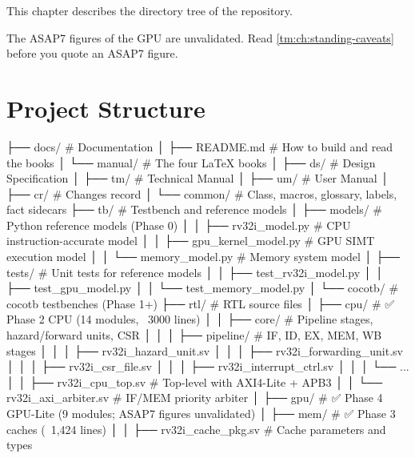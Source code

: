 This chapter describes the directory tree of the repository.

\begin{information}
The ASAP7 figures of the GPU are unvalidated. Read \cref{tm:ch:standing-caveats} before you quote an ASAP7 figure.
\end{information}

\section{Project Structure}\label{um:guide:project-structure}

\begin{logblock}
├── docs/                         # Documentation
│   ├── README.md                 # How to build and read the books
│   └── manual/                   # The four LaTeX books
│       ├── ds/                   # Design Specification
│       ├── tm/                   # Technical Manual
│       ├── um/                   # User Manual
│       ├── cr/                   # Changes record
│       └── common/               # Class, macros, glossary, labels, fact sidecars
├── tb/                          # Testbench and reference models
│   ├── models/                   # Python reference models (Phase 0)
│   │   ├── rv32i_model.py        # CPU instruction-accurate model
│   │   ├── gpu_kernel_model.py   # GPU SIMT execution model
│   │   └── memory_model.py       # Memory system model
│   ├── tests/                    # Unit tests for reference models
│   │   ├── test_rv32i_model.py
│   │   ├── test_gpu_model.py
│   │   └── test_memory_model.py
│   └── cocotb/                   # cocotb testbenches (Phase 1+)
├── rtl/                          # RTL source files
│   ├── cpu/                      # ✅ Phase 2 CPU (14 modules, ~3000 lines)
│   │   ├── core/                 # Pipeline stages, hazard/forward units, CSR
│   │   │   ├── pipeline/         # IF, ID, EX, MEM, WB stages
│   │   │   ├── rv32i_hazard_unit.sv
│   │   │   ├── rv32i_forwarding_unit.sv
│   │   │   ├── rv32i_csr_file.sv
│   │   │   ├── rv32i_interrupt_ctrl.sv
│   │   │   └── ...
│   │   ├── rv32i_cpu_top.sv      # Top-level with AXI4-Lite + APB3
│   │   └── rv32i_axi_arbiter.sv  # IF/MEM priority arbiter
│   ├── gpu/                      # ✅ Phase 4 GPU-Lite (9 modules; ASAP7 figures unvalidated)
│   ├── mem/                      # ✅ Phase 3 caches (~1,424 lines)
│   │   ├── rv32i_cache_pkg.sv    # Cache parameters and types

\end{logblock}
